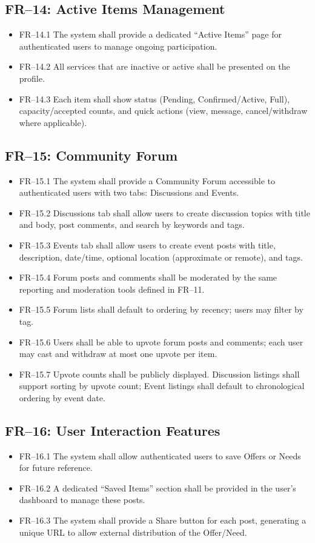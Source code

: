 \documentclass[11pt,a4paper]{report}
\begin{document}
\subsection{FR--14: Active Items Management}
\begin{itemize}
    \item FR--14.1 The system shall provide a dedicated ``Active Items'' page for authenticated users to manage ongoing participation.
    \item FR--14.2 All services that are inactive or active shall be presented on the profile.
    \item FR--14.3 Each item shall show status (Pending, Confirmed/Active, Full), capacity/accepted counts, and quick actions (view, message, cancel/withdraw where applicable).
\end{itemize}

\subsection{FR--15: Community Forum}
\begin{itemize}
    \item FR--15.1 The system shall provide a Community Forum accessible to authenticated users with two tabs: Discussions and Events.
    \item FR--15.2 Discussions tab shall allow users to create discussion topics with title and body, post comments, and search by keywords and tags.
    \item FR--15.3 Events tab shall allow users to create event posts with title, description, date/time, optional location (approximate or remote), and tags.
    \item FR--15.4 Forum posts and comments shall be moderated by the same reporting and moderation tools defined in FR--11.
    \item FR--15.5 Forum lists shall default to ordering by recency; users may filter by tag.
    \item FR--15.6 Users shall be able to upvote forum posts and comments; each user may cast and withdraw at most one upvote per item.
    \item FR--15.7 Upvote counts shall be publicly displayed. Discussion listings shall support sorting by upvote count; Event listings shall default to chronological ordering by event date.
\end{itemize}

\subsection{FR--16: User Interaction Features}
\begin{itemize}
    \item FR--16.1 The system shall allow authenticated users to save Offers or Needs for future reference.
    \item FR--16.2 A dedicated ``Saved Items'' section shall be provided in the user's dashboard to manage these posts.
    \item FR--16.3 The system shall provide a Share button for each post, generating a unique URL to allow external distribution of the Offer/Need.
\end{itemize}
\end{document}
